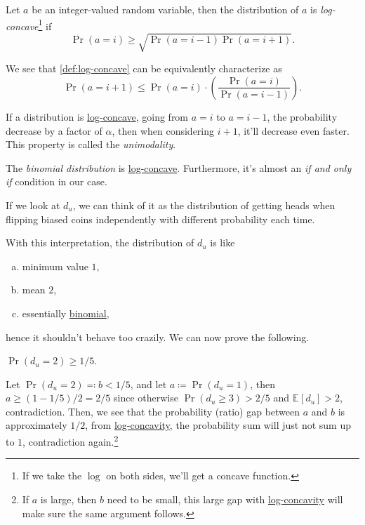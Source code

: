 \begin{definition}\label{def:log-concave}
	Let \(a\) be an integer-valued random variable, then the distribution of \(a\) is \emph{log-concave}\footnote{If we take the \(\log\) on both sides, we'll get a concave function.} if
	\[
		\Pr(a=i) \geq \sqrt{\Pr(a=i-1) \Pr(a=i+1)}.
	\]
\end{definition}

We see that \autoref{def:log-concave} can be equivalently characterize as
\[
	\Pr(a=i+1) \leq \Pr(a=i) \cdot \left( \frac{\Pr(a=i)}{\Pr(a=i-1)} \right).
\]

\begin{intuition}
	If a distribution is \hyperref[def:log-concave]{log-concave}, going from \(a=i\) to \(a=i-1\), the probability decrease by a factor of \(\alpha\), then when considering \(i+1\), it'll decrease even faster. This property is called the \emph{unimodality}.
\end{intuition}

\begin{eg}
	The \emph{binomial distribution} is \hyperref[def:log-concave]{log-concave}. Furthermore, it's almost an \emph{if and only if} condition in our case.
\end{eg}
\begin{explanation}
	If we look at \(d_u\), we can think of it as the distribution of getting heads when flipping biased coins independently with different probability each time.
\end{explanation}

With this interpretation, the distribution of \(d_u\) is like
\begin{enumerate}[(a)]
	\item minimum value \(1\),
	\item mean \(2\),
	\item essentially \href{https://en.wikipedia.org/wiki/Binomial_distribution}{binomial},
\end{enumerate}
hence it shouldn't behave too crazily. We can now prove the following.

\begin{claim}
	\(\Pr(d_u = 2) \geq 1 / 5\).
\end{claim}
\begin{explanation}
	Let \(\Pr(d_u = 2) \eqqcolon b < 1 / 5\), and let \(a\coloneqq \Pr(d_u = 1)\), then \(a \geq (1 - 1 / 5) / 2 = 2 / 5\) since otherwise \(\Pr(d_u \geq 3) > 2 / 5\) and \(\mathbb{E}_{}\left[ d_u \right] > 2 \), contradiction. Then, we see that the probability (ratio) gap between \(a\) and \(b\) is approximately \(1 / 2\), from \hyperref[def:log-concave]{log-concavity}, the probability sum will just not sum up to \(1\), contradiction again.\footnote{If \(a\) is large, then \(b\) need to be small, this large gap with \hyperref[def:log-concave]{log-concavity} will make sure the same argument follows.}
\end{explanation}


